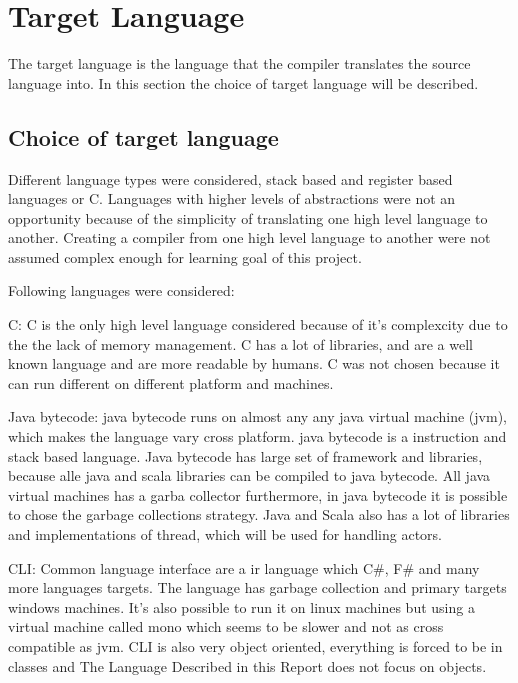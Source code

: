 \section{Target Language}
\label{sec:targetLanguage}

The target language is the language that the compiler translates the source language into. In this section the choice of target language will be described. %

\subsection{Choice of target language}

Different language types were considered, stack based and register based languages or C. %
Languages with higher levels of abstractions were not an opportunity because of the simplicity of translating one high level language to another. %
Creating a compiler from one high level language to another were not assumed complex enough for learning goal of this project. 

Following languages were considered:

C:
C is the only high level language considered because of it's complexcity due to the the lack of memory management. C has a lot of libraries, and are a well known language and are more readable by humans. C was not chosen because it can run different on different platform and machines. %

Java bytecode: 
java bytecode runs on almost any any java virtual machine (jvm), which makes the language vary cross platform. java bytecode is a instruction and stack based language. Java bytecode has large set of framework and libraries, because alle java and scala libraries can be compiled to java bytecode. All java virtual machines has a garba collector furthermore, in java bytecode it is possible to chose the garbage collections strategy.
Java and Scala also has a lot of libraries and implementations of thread, which will be used for handling actors.

CLI:
Common language interface are a ir language which C#, F# and many more languages targets. The language has garbage collection and primary targets windows machines.  It’s also possible to run it on linux machines but using a virtual machine called mono which seems to be slower and not as cross compatible as jvm. 
CLI is also very object oriented, everything is forced to be in classes and The Language Described in this Report does not focus on objects. 


